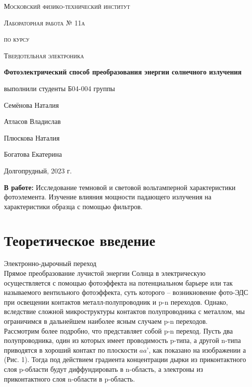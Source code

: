 \documentclass[a4paper,12pt]{article} %
\begin{document}
\begin{titlepage}
	\centering
	\vspace{5cm}
	{\scshape\LARGE Московский физико-технический институт \par}
	\vspace{4cm}
	{\scshape\Large Лабораторная работа № 11а \par}
        {\scshape\Large по курсу \par}
        {\scshape\Large Твердотельная электроника \par}
	\vspace{1cm}
	{\huge\bfseries  Фотоэлектрический способ преобразования энергии солнечного излучения \par}
	\vspace{1cm}
	\vfill
\begin{flushright}
	{\large выполнили студенты Б04-004 группы}\par
	\vspace{0.3cm}
	{\LARGE Семёнова Наталия}\par
        \vspace{0.3cm}
	{\LARGE Атласов Владислав}\par
        \vspace{0.3cm}
	{\LARGE Плюскова Наталия}\par
        \vspace{0.3cm}
	{\LARGE Богатова Екатерина}
\end{flushright}

	\vfill
	
	Долгопрудный, 2023 г.
\end{titlepage}

\textbf{В работе:} Исследование темновой и световой вольтамперной характеристики фотоэлемента. Изучение влияния мощности падающего излучения на характеристики образца с помощью фильтров.

\section{Теоретическое введение}
Электронно-дырочный переход\\
Прямое преобразование лучистой энергии Солнца в электрическую осуществляется с помощью фотоэффекта на потенциальном барьере или так называемого вентильного фотоэффекта, суть которого – возникновение фото-ЭДС при освещении контактов металл-полупроводник и p-n переходов. Однако, вследствие сложной микроструктуры контактов полупроводника с металлом, мы ограничимся в дальнейшем наиболее ясным случаем p-n переходов.\\
Рассмотрим более подробно, что представляет собой p-n переход. Пусть два полупроводника, один из которых имеет проводимость p-типа, а другой n-типа приводятся в хороший контакт по плоскости $aa$', как показано на изображении а (Рис. 1). Тогда под действием градиента концентрации дырки из приконтактного слоя p-области будут диффундировать в n-область, а электроны из приконтактного слоя n-области в p-область.
\end{document}
